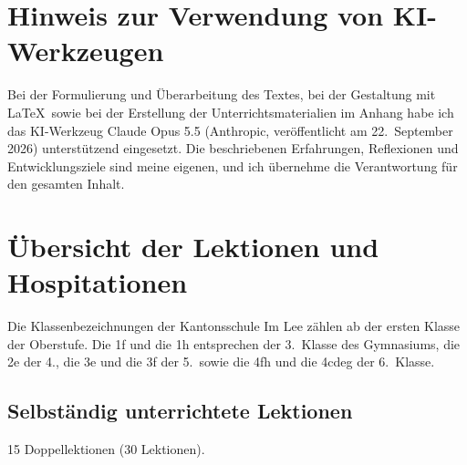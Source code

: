 \documentclass[12pt,a4paper]{article}
\begin{document}
\section*{Hinweis zur Verwendung von KI-Werkzeugen}

\noindent Bei der Formulierung und Überarbeitung des Textes, bei der Gestaltung mit
\LaTeX\ sowie bei der Erstellung der Unterrichtsmaterialien im Anhang habe ich
das KI-Werkzeug Claude Opus 5.5 (Anthropic, veröffentlicht am 22.~September 2026)
unterstützend eingesetzt. Die beschriebenen
Erfahrungen, Reflexionen und Entwicklungsziele sind meine eigenen, und ich
übernehme die Verantwortung für den gesamten Inhalt.

\newpage
\appendix
\section{Übersicht der Lektionen und Hospitationen}
\label{anh:lektionen}

Die Klassenbezeichnungen der Kantonsschule Im Lee zählen ab der ersten Klasse
der Oberstufe. Die 1f und die 1h entsprechen der 3.~Klasse des Gymnasiums,
die 2e der 4., die 3e und die 3f der 5.\ sowie die 4fh und die 4cdeg der
6.~Klasse.

\subsection*{Selbständig unterrichtete Lektionen}

15 Doppellektionen (30 Lektionen).
\end{document}
